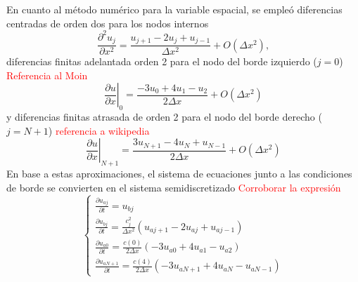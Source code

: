\documentclass[aps,prb,twocolumn,superscriptaddress,floatfix,longbibliography,10pt]{revtex4-2}
\newcounter{para}
\begin{document}
En cuanto al método numérico para la variable espacial, se empleó diferencias centradas de orden dos para los nodos internos
\[\frac{\partial^2 u_j}{\partial x^2} = \frac{u_{j+1} - 2 u_j + u_{j-1}}{\Delta x^2} + O(\Delta x^2),  \]
diferencias finitas adelantada orden 2 para el nodo del borde izquierdo ($j = 0$) \textcolor{red}{Referencia al Moin}
\[\left . \frac{\partial u}{\partial x} \right |_0 = \frac{-3 u_0 + 4 u_{1} - u_{2}}{2 \Delta x} + O(\Delta x^2) \]
y diferencias finitas atrasada de orden 2 para el nodo del borde derecho ($j = N + 1$) \textcolor{red}{referencia a wikipedia}
\[\left . \frac{\partial u}{\partial x} \right |_{N+1} = \frac{3 u_{N+1} - 4 u_N + u_{N-1}}{2 \Delta x} + O(\Delta x^2) \]
En base a estas aproximaciones, el sistema de ecuaciones junto a las condiciones de borde se convierten en el sistema semidiscretizado \textcolor{red}{Corroborar la expresión}
\begin{equation}
  \left \{ \begin{matrix}
   \frac{\partial u_{a j}}{\partial t} = u_{b j} \\
   \frac{\partial u_{b j}}{\partial t} = \frac{c_j^2}{\Delta x^2} (u_{a j+1} - 2 u_{a j} + u_{a j-1}) \\
   \frac{\partial u_{a 0}}{\partial t} = \frac{c(0)}{2 \Delta x} (-3 u_{a 0} + 4 u_{a 1} - u_{a 2}) \\
   \frac{\partial u_{a N+1}}{\partial t} = \frac{c(4)}{2 \Delta x} (-3u_{a N+1} + 4 u_{a N} - u_{a N-1}) 
  \end{matrix} \right .
  \label{eq:sistema_semi_discretizado}
\end{equation}
\end{document}
